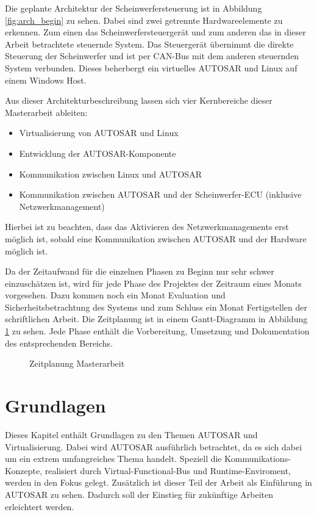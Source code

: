 \documentclass[
  a4paper,					    %
  twoside,
  DIV=calc,     				%
  bibliography=totoc,
  cleardoublepage=empty,
  ngerman,     					%
  final       					%
]{scrbook}
\begin{document}
Die geplante Architektur der Scheinwerfersteuerung ist in Abbildung \ref{fig:arch_begin} zu sehen. Dabei sind zwei getrennte Hardwareelemente zu erkennen. Zum einen das Scheinwerfersteuergerät und zum anderen das in dieser Arbeit betrachtete steuernde System. Das Steuergerät übernimmt die direkte Steuerung der Scheinwerfer und ist per CAN-Bus mit dem anderen steuernden System verbunden.  Dieses beherbergt ein virtuelles AUTOSAR und Linux auf einem Windows Host.

Aus dieser Architekturbeschreibung lassen sich vier Kernbereiche dieser Masterarbeit ableiten:

\begin{itemize}
    \item Virtualisierung von AUTOSAR und Linux
    \item Entwicklung der AUTOSAR-Komponente
    \item Kommunikation zwischen Linux und AUTOSAR
    \item Kommunikation zwischen AUTOSAR und der Scheinwerfer-ECU (inklusive Netzwerkmanagement)
\end{itemize}

Hierbei ist zu beachten, dass das Aktivieren des Netzwerkmanagements erst möglich ist, sobald eine Kommunikation zwischen AUTOSAR und der Hardware möglich ist.

Da der Zeitaufwand für die einzelnen Phasen zu Beginn nur sehr schwer einzuschätzen ist, wird für jede Phase des Projektes der Zeitraum eines Monats vorgesehen. Dazu kommen noch ein Monat Evaluation und Sicherheitsbetrachtung des Systems und zum Schluss ein Monat Fertigstellen der schriftlichen Arbeit. Die Zeitplanung ist in einem Gantt-Diagramm in Abbildung \ref{fig:gantt} zu sehen. Jede Phase enthält die Vorbereitung, Umsetzung und Dokumentation des entsprechenden Bereichs.

\begin{figure}[ht]
    \centering
    
    \caption{Zeitplanung Masterarbeit}
    \label{fig:gantt}
\end{figure}


\chapter{Grundlagen}
\label{sec:Grundlagen}
Dieses Kapitel enthält Grundlagen zu den Themen AUTOSAR und Virtualisierung. Dabei wird AUTOSAR ausführlich betrachtet, da es sich dabei um ein extrem umfangreiches Thema handelt. Speziell die Kommunikations-Konzepte, realisiert durch Virtual-Functional-Bus und Runtime-Enviroment, werden in den Fokus gelegt. Zusätzlich ist dieser Teil der Arbeit als Einführung in AUTOSAR zu sehen. Dadurch soll der Einstieg für zukünftige Arbeiten erleichtert werden.
\end{document}

